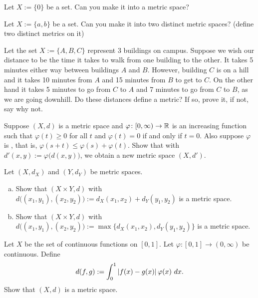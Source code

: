 \begin{exercise}
Let $X := \{ 0 \}$ be a set.  Can you make it into a metric space?
\end{exercise}

\begin{exercise}
Let $X := \{ a, b \}$ be a set.  Can you make it into two distinct metric
spaces?  (define two distinct metrics on it)
\end{exercise}

\begin{exercise}
Let the set $X := \{ A, B, C \}$ represent 3 buildings on campus.  Suppose we
wish our distance to be the time it takes to walk from one building to
the other.
It takes 5 minutes either way between buildings $A$ and $B$.  However,
building $C$ is on a hill and it takes 10 minutes from $A$ and 15 minutes
from $B$ to get to $C$.  On the other hand it takes 5 minutes to go
from $C$ to $A$ and 7 minutes to go from $C$ to $B$, as we are going
downhill.  Do these distances define a metric?  If so, prove it, if not, say
why not.
\end{exercise}

\begin{exercise}
Suppose $(X,d)$ is a metric space and
$\varphi \colon [0,\infty) \to {\mathbb{R}}$ is
an increasing function such that 
$\varphi(t) \geq 0$ for all $t$ and $\varphi(t) = 0$ if and only if
$t=0$.  Also suppose $\varphi$ is \emph{},
that is, $\varphi(s+t) \leq \varphi(s)+\varphi(t)$.
Show that with $d'(x,y) := \varphi\bigl(d(x,y)\bigr)$, we obtain a new
metric space $(X,d')$.
\end{exercise}

\begin{exercise} \label{exercise:mscross}
Let $(X,d_X)$ and $(Y,d_Y)$ be metric spaces.
\begin{enumerate}[a)]
\item
Show that $(X \times Y,d)$ with
$d\bigl( (x_1,y_1), (x_2,y_2) \bigr) := d_X(x_1,x_2) + d_Y(y_1,y_2)$ is
a metric space.
\item
Show that $(X \times Y,d)$ with
$d\bigl( (x_1,y_1), (x_2,y_2) \bigr) := \max \{ d_X(x_1,x_2) , d_Y(y_1,y_2) \}$ is
a metric space.
\end{enumerate}
\end{exercise}

\begin{exercise}
Let $X$ be the set of continuous functions on $[0,1]$.  Let $\varphi \colon
[0,1] \to (0,\infty)$ be continuous.  Define
\begin{equation*}
d(f,g) := \int_0^1 \left\lvert {f(x)-g(x)} \right\rvert\varphi(x)~dx .
\end{equation*}
Show that $(X,d)$ is a metric space.
\end{exercise}


